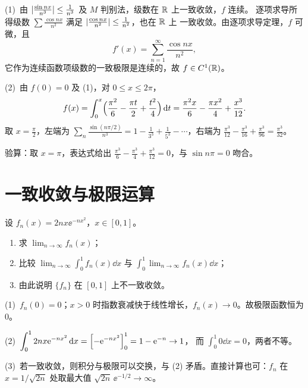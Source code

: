 \documentclass{mojing-exercise}
\begin{document}
\begin{solution}
(1)~由 $\lvert\frac{\sin nx}{n^3}\rvert\le\frac{1}{n^3}$ 及 $M$ 判别法，级数在 $\mathbb{R}$ 上一致收敛，$f$ 连续。
逐项求导所得级数 $\sum\frac{\cos nx}{n^2}$ 满足 $\lvert\frac{\cos nx}{n^2}\rvert\le\frac{1}{n^2}$，也在 $\mathbb{R}$ 上
一致收敛。由逐项求导定理，$f$ 可微，且
\[
  f'(x)=\sum_{n=1}^{\infty}\frac{\cos nx}{n^2},
\]
它作为连续函数项级数的一致极限是连续的，故 $f\in C^1(\mathbb{R})$。

(2)~由 $f(0)=0$ 及 (1)，对 $0\le x\le2\pi$，
\[
  f(x)=\int_0^x\Bigl(\frac{\pi^2}{6}-\frac{\pi t}{2}+\frac{t^2}{4}\Bigr)\mathop{}\!\mathrm{d} t
      =\frac{\pi^2x}{6}-\frac{\pi x^2}{4}+\frac{x^3}{12}.
\]
取 $x=\frac{\pi}{2}$，左端为 $\sum_n\frac{\sin(n\pi/2)}{n^3}=1-\frac{1}{3^3}+\frac{1}{5^3}-\dotsb$，右端为
$\frac{\pi^3}{12}-\frac{\pi^3}{16}+\frac{\pi^3}{96}=\frac{\pi^3}{32}$。
\begin{note}
验算：取 $x=\pi$，表达式给出 $\frac{\pi^3}{6}-\frac{\pi^3}{4}+\frac{\pi^3}{12}=0$，与 $\sin n\pi=0$ 吻合。
\end{note}
\end{solution}

\section{一致收敛与极限运算}

\begin{problem}[difficulty=1, space=4.5cm]
设 $f_n(x)=2nx\ee^{-nx^2}$，$x\in[0,1]$。
\begin{enumerate}
  \item 求 $\lim_{n\to\infty}f_n(x)$；
  \item 比较 $\displaystyle\lim_{n\to\infty}\int_0^1f_n(x)\dd x$ 与
        $\displaystyle\int_0^1\lim_{n\to\infty}f_n(x)\dd x$；
  \item 由此说明 $\{f_n\}$ 在 $[0,1]$ 上不一致收敛。
\end{enumerate}
\end{problem}

\begin{solution}
(1)~$f_n(0)=0$；$x>0$ 时指数衰减快于线性增长，$f_n(x)\to0$。故极限函数恒为 $0$。

(2)~$\displaystyle\int_0^1 2nx\mathrm{e}^{-nx^2}\mathop{}\!\mathrm{d} x=\Bigl[-\mathrm{e}^{-nx^2}\Bigr]_0^1=1-\mathrm{e}^{-n}\to1$，
而 $\int_0^1 0\dd x=0$，两者不等。

(3)~若一致收敛，则积分与极限可以交换，与 (2) 矛盾。直接计算也可：$f_n$ 在
$x=1/\sqrt{2n}$ 处取最大值 $\sqrt{2n}\,\ee^{-1/2}\to\infty$。
\end{solution}
\end{document}
